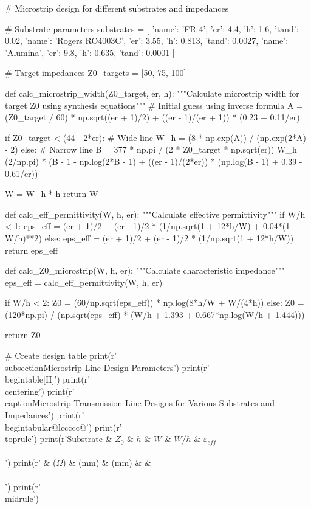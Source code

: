 \documentclass[11pt,a4paper]{article}
\begin{document}
\begin{pycode}
# Microstrip design for different substrates and impedances

# Substrate parameters
substrates = [
    {'name': 'FR-4', 'er': 4.4, 'h': 1.6, 'tand': 0.02},
    {'name': 'Rogers RO4003C', 'er': 3.55, 'h': 0.813, 'tand': 0.0027},
    {'name': 'Alumina', 'er': 9.8, 'h': 0.635, 'tand': 0.0001}
]

# Target impedances
Z0_targets = [50, 75, 100]

def calc_microstrip_width(Z0_target, er, h):
    """Calculate microstrip width for target Z0 using synthesis equations"""
    # Initial guess using inverse formula
    A = (Z0_target / 60) * np.sqrt((er + 1)/2) + ((er - 1)/(er + 1)) * (0.23 + 0.11/er)

    if Z0_target < (44 - 2*er):
        # Wide line
        W_h = (8 * np.exp(A)) / (np.exp(2*A) - 2)
    else:
        # Narrow line
        B = 377 * np.pi / (2 * Z0_target * np.sqrt(er))
        W_h = (2/np.pi) * (B - 1 - np.log(2*B - 1) + ((er - 1)/(2*er)) * (np.log(B - 1) + 0.39 - 0.61/er))

    W = W_h * h
    return W

def calc_eff_permittivity(W, h, er):
    """Calculate effective permittivity"""
    if W/h < 1:
        eps_eff = (er + 1)/2 + (er - 1)/2 * (1/np.sqrt(1 + 12*h/W) + 0.04*(1 - W/h)**2)
    else:
        eps_eff = (er + 1)/2 + (er - 1)/2 * (1/np.sqrt(1 + 12*h/W))
    return eps_eff

def calc_Z0_microstrip(W, h, er):
    """Calculate characteristic impedance"""
    eps_eff = calc_eff_permittivity(W, h, er)

    if W/h < 2:
        Z0 = (60/np.sqrt(eps_eff)) * np.log(8*h/W + W/(4*h))
    else:
        Z0 = (120*np.pi) / (np.sqrt(eps_eff) * (W/h + 1.393 + 0.667*np.log(W/h + 1.444)))

    return Z0

# Create design table
print(r'\\subsection{Microstrip Line Design Parameters}')
print(r'\\begin{table}[H]')
print(r'\\centering')
print(r'\\caption{Microstrip Transmission Line Designs for Various Substrates and Impedances}')
print(r'\\begin{tabular}{@{}lccccc@{}}')
print(r'\\toprule')
print(r'Substrate & $Z_0$ & $h$ & $W$ & $W/h$ & $\varepsilon_{eff}$ \\\\')
print(r' & ($\Omega$) & (mm) & (mm) & & \\\\')
print(r'\\midrule')


\end{pycode}
\end{document}
